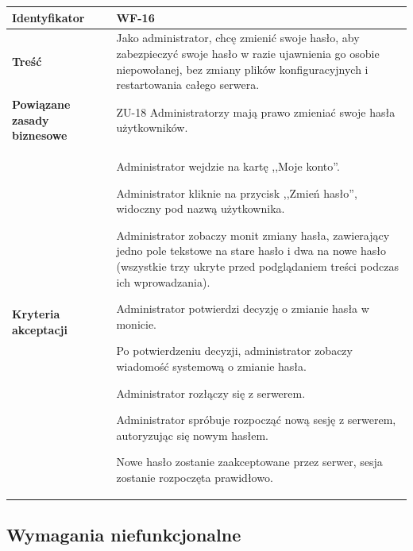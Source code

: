 \begin{tabular}{ | l | l | }
	\hline
		\textbf{Identyfikator} &
		WF-16
		\\

	\hline
		\textbf{Treść} & \parbox[t]{11cm}{
			Jako administrator, chcę zmienić swoje hasło, aby zabezpieczyć swoje hasło w razie ujawnienia go osobie niepowołanej, bez zmiany plików konfiguracyjnych i restartowania całego serwera.
		}\\

	\hline
		\parbox[t]{4cm}{\textbf{Powiązane zasady biznesowe}} & \parbox[t]{11cm}{
    ZU-18 Administratorzy mają prawo zmieniać swoje hasła
    użytkowników.
		}\\

	\hline
		\parbox[t]{4cm}{\textbf{Kryteria akceptacji}} & \parbox[t]{11cm}{
			\begin{enumreq}
				\item Administrator wejdzie na kartę ,,Moje konto''.
        \item Administrator kliknie na przycisk ,,Zmień hasło'',
        widoczny pod nazwą użytkownika.
				\item Administrator zobaczy monit zmiany hasła,
        zawierający jedno pole tekstowe na stare hasło i dwa na
        nowe hasło (wszystkie trzy ukryte przed podglądaniem
        treści podczas ich wprowadzania).
        \item Administrator potwierdzi decyzję o zmianie hasła w monicie.
        \item Po potwierdzeniu decyzji, administrator zobaczy wiadomość systemową o zmianie hasła.
        \item Administrator rozłączy się z serwerem.
        \item Administrator spróbuje rozpocząć nową sesję z
        serwerem, autoryzując się nowym hasłem.
        \item Nowe hasło zostanie zaakceptowane przez serwer,
        sesja zostanie rozpoczęta prawidłowo.
			\end{enumreq}
			}
		\\

	\hline
\end{tabular}

\subsection{Wymagania niefunkcjonalne}

\phantom{}

